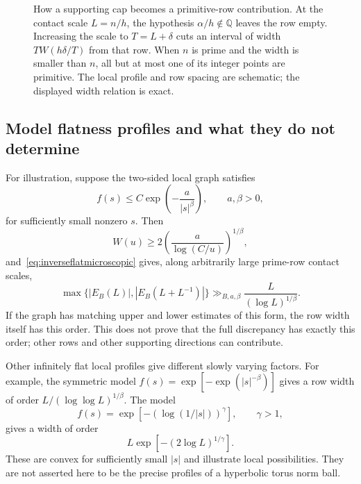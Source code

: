 \begin{figure}[htbp]
\caption[A flat supporting cap and a primitive-row burst]{How a supporting cap becomes a primitive-row contribution.
At the contact scale $L=n/h$, the hypothesis $\alpha/h\notin\mathbb Q$
leaves the row empty. Increasing the scale to $T=L+\delta$ cuts an interval
of width $TW(h\delta/T)$ from that row. When $n$ is prime and the width
is smaller than $n$, all but at most one of its integer points are
primitive. The local profile and row spacing are schematic; the
displayed width relation is exact.}
\label{fig:mono-flat-row}
\end{figure}

\subsection{Model flatness profiles and what they do not determine}
\label{subsec:flatnessmodels}

For illustration, suppose the two-sided local graph satisfies
\[
 f(s)\leq C\exp\!\left(-\frac a{|s|^\beta}\right),
 \qquad a,\beta>0,
\]
for sufficiently small nonzero $s$. Then
\[
 W(u)\geq
 2\left(\frac a{\log(C/u)}\right)^{1/\beta},
\]
and~\eqref{eq:inverseflatmicroscopic} gives, along arbitrarily large
prime-row contact scales,
\begin{equation}
 \max\{|E_B(L)|,|E_B(L+L^{-1})|\}
 \gg_{B,a,\beta}\frac L{(\log L)^{1/\beta}}.
 \label{eq:exponentialflatrow}
\end{equation}
If the graph has matching upper and lower estimates of this form, the
row width itself has this order. This does not prove that the full
discrepancy has exactly this order; other rows and other supporting
directions can contribute.

Other infinitely flat local profiles give different slowly varying
factors. For example, the symmetric model
$f(s)=\exp[-\exp(|s|^{-\beta})]$ gives a row width of order
$L/(\log\log L)^{1/\beta}$. The model
\[
 f(s)=\exp[-(\log(1/|s|))^\gamma],\qquad\gamma>1,
\]
gives a width of order
\[
 L\exp[-(2\log L)^{1/\gamma}].
\]
These are convex for sufficiently small $|s|$ and illustrate local
possibilities. They are not asserted here to be the precise profiles
of a hyperbolic torus norm ball.

